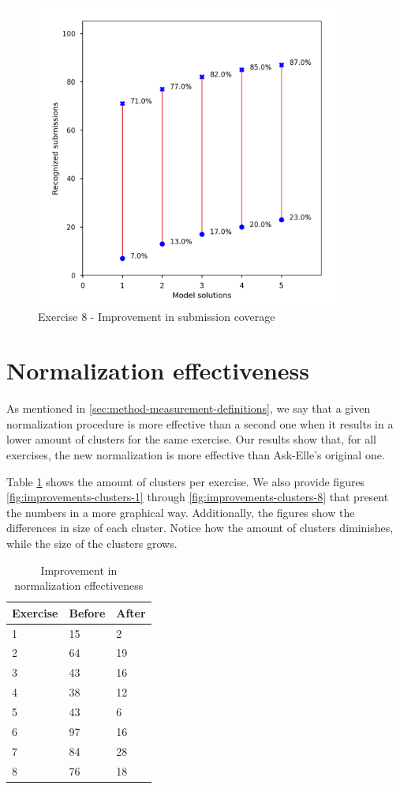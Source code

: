 \begin{figure}
\centering
\includegraphics[height=10cm]{graphs/coverage-8.png}
\caption{Exercise 8 - Improvement in submission coverage}
\label{fig:improvements-coverage-8}
\end{figure}

\section{Normalization effectiveness}

As mentioned in \ref{sec:method-measurement-definitions}, we say that a given normalization procedure is more effective than a second one when it results in a lower amount of clusters for the same exercise. Our results show that, for all exercises, the new normalization is more effective than Ask-Elle's original one.

Table \ref{tb:improvements-clusters} shows the amount of clusters per exercise. We also provide figures \ref{fig:improvements-clusters-1} through \ref{fig:improvements-clusters-8} that present the numbers in a more graphical way. Additionally, the figures show the differences in size of each cluster. Notice how the amount of clusters diminishes, while the size of the clusters grows.

\begin{table}
\centering
\begin{tabular}{ m{6em} | m{6em} | m{6em} }
Exercise & Before & After \\
\hline
1 & 15 & 2 \\
\hline
2 & 64 & 19 \\
\hline
3 & 43 & 16 \\
\hline
4 & 38 & 12 \\
\hline
5 & 43 & 6 \\
\hline
6 & 97 & 16 \\
\hline
7 & 84 & 28 \\
\hline
8 & 76 & 18
\end{tabular}
\caption{Improvement in normalization effectiveness}
\label{tb:improvements-clusters}
\end{table}

